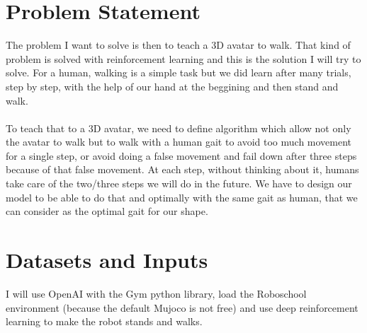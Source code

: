 \documentclass{article}
\begin{document}
	\section{Problem Statement}

  The problem I want to solve is then to teach a 3D avatar to walk. That kind of
  problem is solved with reinforcement learning and this is the solution I will
  try to solve. For a human, walking is a simple task but we did learn after
  many trials, step by step, with the help of our hand at the beggining and then
  stand and walk.
  \paragraph{}
  To teach that to a 3D avatar, we need to define algorithm
  which allow not only the avatar to walk but to walk with a human gait to avoid
  too much movement for a single step, or avoid doing a false movement and fail
  down after three steps because of that false movement. At each step, without
  thinking about it, humans take care of the two/three steps we will do in the
  future. We have to design our model to be able to do that and optimally with
  the same gait as human, that we can consider as the optimal gait for our shape.
	
	\section{Datasets and Inputs}

  I will use OpenAI with the Gym python library\cite{1606.01540}, load the
  Roboschool environment (because the default Mujoco is not free) and use deep
  reinforcement learning to make the robot stands and walks.
  
\end{document}
